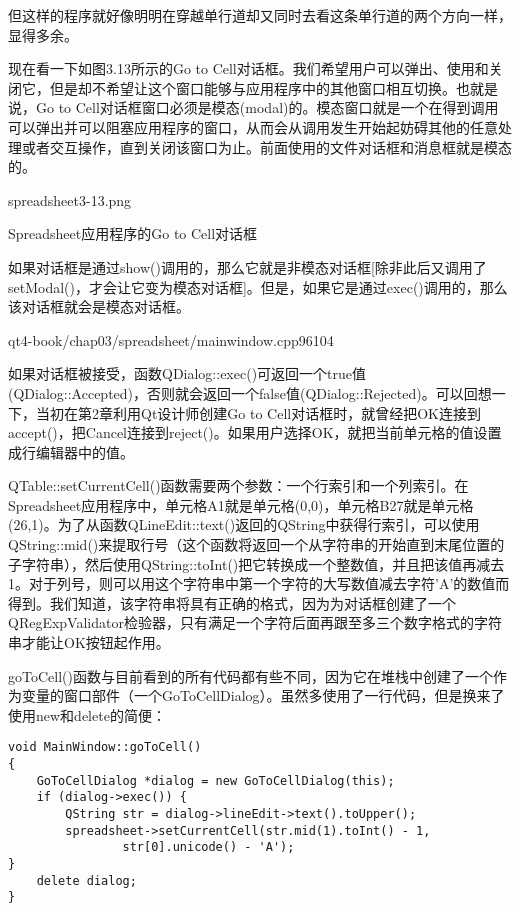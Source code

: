 \documentclass[11pt,oneside]{book}
\begin{document}
\begin{common-format}
但这样的程序就好像明明在穿越单行道却又同时去看这条单行道的两个方向一样，显得多余。

现在看一下如图3.13所示的Go to Cell对话框。我们希望用户可以弹出、使用和关闭它，但是却不希望让这个窗口能够与应用程序中的其他窗口相互切换。也就是说，Go to Cell对话框窗口必须是模态(modal)的。模态窗口就是一个在得到调用可以弹出并可以阻塞应用程序的窗口，从而会从调用发生开始起妨碍其他的任意处理或者交互操作，直到关闭该窗口为止。前面使用的文件对话框和消息框就是模态的。

\begin{fig}{spreadsheet3-13.png}
\caption{Spreadsheet应用程序的Go to Cell对话框}
\label{fig:spreadsheet3-13.png}
\end{fig}

如果对话框是通过show()调用的，那么它就是非模态对话框[除非此后又调用了setModal()，才会让它变为模态对话框]。但是，如果它是通过exec()调用的，那么该对话框就会是模态对话框。

\begin{cppline}{qt4-book/chap03/spreadsheet/mainwindow.cpp}{96}{104}
\end{cppline}

如果对话框被接受，函数QDialog::exec()可返回一个true值\\ (QDialog::Accepted)，否则就会返回一个false值(QDialog::Rejected)。可以回想一下，当初在第2章利用Qt设计师创建Go to Cell对话框时，就曾经把OK连接到accept()，把Cancel连接到reject()。如果用户选择OK，就把当前单元格的值设置成行编辑器中的值。

QTable::setCurrentCell()函数需要两个参数：一个行索引和一个列索引。在Spreadsheet应用程序中，单元格A1就是单元格(0,0)，单元格B27就是单元格(26,1)。为了从函数QLineEdit::text()返回的QString中获得行索引，可以使用QString::mid()来提取行号（这个函数将返回一个从字符串的开始直到末尾位置的子字符串），然后使用QString::toInt()把它转换成一个整数值，并且把该值再减去1。对于列号，则可以用这个字符串中第一个字符的大写数值减去字符'A'的数值而得到。我们知道，该字符串将具有正确的格式，因为为对话框创建了一个QRegExpValidator检验器，只有满足一个字符后面再跟至多三个数字格式的字符串才能让OK按钮起作用。

goToCell()函数与目前看到的所有代码都有些不同，因为它在堆栈中创建了一个作为变量的窗口部件（一个GoToCellDialog）。虽然多使用了一行代码，但是换来了使用new和delete的简便：

\begin{Verbatim}
void MainWindow::goToCell()
{
    GoToCellDialog *dialog = new GoToCellDialog(this);
    if (dialog->exec()) {
        QString str = dialog->lineEdit->text().toUpper();
        spreadsheet->setCurrentCell(str.mid(1).toInt() - 1,
                str[0].unicode() - 'A');
}
    delete dialog;
}
\end{Verbatim}


\end{common-format}
\end{document}
